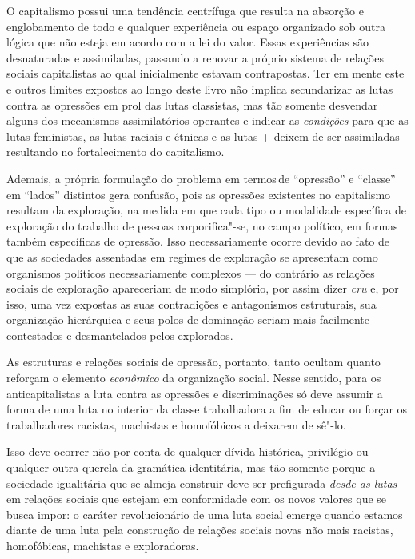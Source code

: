 O capitalismo possui uma tendência centrífuga que resulta na absorção e
englobamento de todo e qualquer experiência ou espaço organizado sob
outra lógica que não esteja em acordo com a lei do valor. Essas
experiências são desnaturadas e assimiladas, passando a renovar a
próprio sistema de relações sociais capitalistas ao qual inicialmente
estavam contrapostas. Ter em mente este e outros limites expostos ao
longo deste livro não implica secundarizar as lutas contra as opressões
em prol das lutas classistas, mas tão somente desvendar alguns dos
mecanismos assimilatórios operantes e indicar as \emph{condições} para
que as lutas feministas, as lutas raciais e étnicas e as lutas +
deixem de ser assimiladas resultando no fortalecimento do capitalismo.

Ademais, a própria formulação do problema em termos\,de ``opressão''
e ``classe'' em ``lados'' distintos gera confusão, pois as opressões
existentes no capitalismo resultam da exploração, na medida em que cada
tipo ou modalidade específica de exploração do trabalho de pessoas
corporifica"-se, no campo político, em formas também específicas de
opressão. Isso necessariamente ocorre devido ao fato de que as
sociedades assentadas em regimes de exploração se apresentam como
organismos políticos necessariamente complexos --- do contrário as
relações sociais de exploração apareceriam de modo simplório, por assim
dizer \emph{cru} e, por isso, uma vez expostas as suas contradições e
antagonismos estruturais, sua organização hierárquica e seus polos de
dominação seriam mais facilmente contestados e desmantelados pelos
explorados.

As estruturas e relações sociais de opressão, portanto, tanto ocultam
quanto reforçam o elemento \emph{econômico} da organização social. Nesse
sentido, para os anticapitalistas a luta contra as opressões e
discriminações só deve assumir a forma de uma luta no interior da classe
trabalhadora a fim de educar ou forçar os trabalhadores racistas,
machistas e homofóbicos a deixarem de sê"-lo.

Isso deve ocorrer não por conta de qualquer dívida histórica, privilégio
ou qualquer outra querela da gramática identitária, mas tão somente
porque a sociedade igualitária que se almeja construir deve ser
prefigurada \emph{desde as lutas} em relações sociais que estejam em
conformidade com os novos valores que se busca impor: o caráter
revolucionário de uma luta social emerge quando estamos diante de uma
luta pela construção de relações sociais novas não mais racistas,
homofóbicas, machistas e exploradoras.

